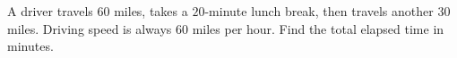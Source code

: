 A driver travels $60$ miles, takes a $20$-minute lunch break, then travels another $30$ miles. Driving speed is always $60$ miles per hour. Find the total elapsed time in minutes.
